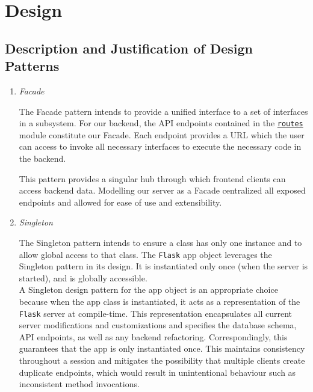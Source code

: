 \documentclass{article}
\begin{document}
\section{Design}

\subsection{Description and Justification of Design Patterns}
\begin{enumerate}
    \item \textit{Facade}
    
    The Facade pattern intends to provide a unified interface to a set of interfaces in a subsystem. 
    For our backend, the API endpoints contained in the \href{https://github.com/alextrosta/brackit/blob/master/backend/app/routes.py}{\texttt{routes}} module constitute our Facade. Each endpoint provides a URL which the user can access
    to invoke all necessary interfaces to execute the necessary code in the backend.

    This pattern provides a singular hub through which frontend clients can access backend data.
    Modelling our server as a Facade centralized all exposed endpoints and allowed for ease of use and extensibility.

    \item \textit{Singleton} 
    
    The Singleton pattern intends to ensure a class has only one instance and to allow global 
    access to that class. The \texttt{Flask} app object leverages the Singleton pattern in its design. It is instantiated only once (when the server is started), and is globally accessible. \\
    A Singleton design pattern for the app object is an appropriate choice because when the app class is instantiated, it acts as a representation of the \texttt{Flask} server at compile-time.
    This representation encapsulates all current server modifications and customizations 
    and specifies the database schema, API endpoints, as well as any backend refactoring. 
    Correspondingly, this guarantees that the app is only instantiated once. This maintains consistency throughout a session and mitigates the possibility that multiple clients create  duplicate endpoints, which would result in unintentional behaviour such as inconsistent method invocations.
\end{enumerate}
\end{document}
